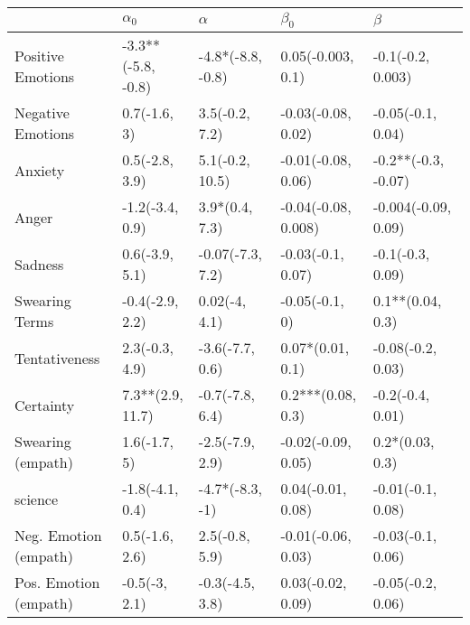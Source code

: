 \begin{tabular}{lllll}
\toprule
{} &          $\alpha_0$ &           $\alpha$ &            $\beta_0$ &              $\beta$ \\
\midrule
Positive Emotions     &  -3.3**(-5.8, -0.8) &  -4.8*(-8.8, -0.8) &    0.05(-0.003, 0.1) &    -0.1(-0.2, 0.003) \\
Negative Emotions     &        0.7(-1.6, 3) &     3.5(-0.2, 7.2) &   -0.03(-0.08, 0.02) &    -0.05(-0.1, 0.04) \\
Anxiety               &      0.5(-2.8, 3.9) &    5.1(-0.2, 10.5) &   -0.01(-0.08, 0.06) &  -0.2**(-0.3, -0.07) \\
Anger                 &     -1.2(-3.4, 0.9) &     3.9*(0.4, 7.3) &  -0.04(-0.08, 0.008) &  -0.004(-0.09, 0.09) \\
Sadness               &      0.6(-3.9, 5.1) &   -0.07(-7.3, 7.2) &    -0.03(-0.1, 0.07) &     -0.1(-0.3, 0.09) \\
Swearing Terms        &     -0.4(-2.9, 2.2) &      0.02(-4, 4.1) &       -0.05(-0.1, 0) &     0.1**(0.04, 0.3) \\
Tentativeness         &      2.3(-0.3, 4.9) &    -3.6(-7.7, 0.6) &     0.07*(0.01, 0.1) &    -0.08(-0.2, 0.03) \\
Certainty             &    7.3**(2.9, 11.7) &    -0.7(-7.8, 6.4) &    0.2***(0.08, 0.3) &     -0.2(-0.4, 0.01) \\
Swearing (empath)     &        1.6(-1.7, 5) &    -2.5(-7.9, 2.9) &   -0.02(-0.09, 0.05) &      0.2*(0.03, 0.3) \\
science               &     -1.8(-4.1, 0.4) &    -4.7*(-8.3, -1) &    0.04(-0.01, 0.08) &    -0.01(-0.1, 0.08) \\
Neg. Emotion (empath) &      0.5(-1.6, 2.6) &     2.5(-0.8, 5.9) &   -0.01(-0.06, 0.03) &    -0.03(-0.1, 0.06) \\
Pos. Emotion (empath) &       -0.5(-3, 2.1) &    -0.3(-4.5, 3.8) &    0.03(-0.02, 0.09) &    -0.05(-0.2, 0.06) \\
\bottomrule
\end{tabular}
